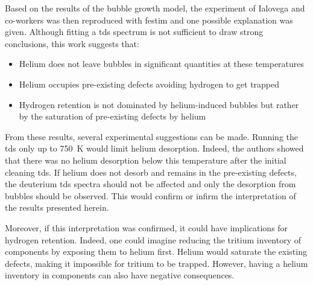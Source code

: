 Based on the results of the bubble growth model, the experiment of Ialovega and co-workers  was then reproduced with \gls{festim} and one possible explanation was given.
Although fitting a \gls{tds} spectrum is not sufficient to draw strong conclusions, this work suggests that:
\begin{itemize}
    \item Helium does not leave bubbles in significant quantities at these temperatures
    \item Helium occupies pre-existing defects avoiding hydrogen to get trapped
    \item Hydrogen retention is not dominated by helium-induced bubbles but rather by the saturation of pre-existing defects by helium
\end{itemize}

From these results, several experimental suggestions can be made.
Running the \gls{tds} only up to \SI{750}{K} would limit helium desorption.
Indeed, the authors \cite{ialovega_hydrogen_2020} showed that there was no helium desorption below this temperature after the initial cleaning \gls{tds}.
If helium does not desorb and remains in the pre-existing defects, the deuterium \gls{tds} spectra should not be affected and only the desorption from bubbles should be observed.
This would confirm or infirm the interpretation of the results presented herein.

Moreover, if this interpretation was confirmed, it could have implications for hydrogen retention.
Indeed, one could imagine reducing the tritium inventory of components by exposing them to helium first.
Helium would saturate the existing defects, making it impossible for tritium to be trapped.
However, having a helium inventory in components can also have negative consequences.
